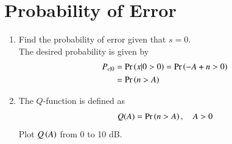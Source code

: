 \documentclass[journal,12pt,twocolumn]{IEEEtran}
\renewcommand\thesection{\arabic{section}}
\begin{document}
\section{Probability of Error}
\begin{enumerate}[label=\thesection.\arabic*
,ref=\thesection.\theenumi]
\item Find the probability of error given that $s=0$.
\\
\solution
The desired probability is given by 
\begin{align}
P_{e|0}&=\Pr\left(x|0 >  0\right) = \Pr\left(-A + n > 0\right)
\\
&=\Pr\left( n > A\right)
\end{align}
%
\item
The $Q$-function is defined as
\begin{equation}
Q(A) = \Pr\left(n > A\right), \quad A > 0
\end{equation}
Plot  $Q\left(A\right)$ from 0 to 10 dB.
%

\end{enumerate}
\end{document}
